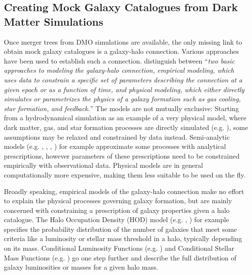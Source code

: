 \subsection{Creating Mock Galaxy Catalogues from Dark Matter Simulations}\label{chap:creating_mock_galaxies}


Once merger trees from DMO simulations are available, the only missing link to obtain mock galaxy catalogues is a galaxy-halo connection.
Various approaches have been used to establish such a connection.
\cite{wechsler_connection} distinguish between ``\textit{two basic approaches to modeling the galaxy-halo connection, \emph{empirical modeling}, which uses data to constrain a specific set of parameters describing the connection at a given epoch or as a function of time, and \emph{physical modeling}, which either directly simulates or parametrizes the physics of a galaxy formation such as gas cooling, star formation, and feedback.}''
The models are not mutually exclusive:
Starting from a hydrodynamical simulation as an example of a very physical model, where dark matter, gas, and star formation processes are directly simulated (e.g. \cite{EAGLE}), some assumptions may be relaxed and constrained by data instead.
Semi-analytic models (e.g. \cite{SA-white}, \cite{SA-durham}, \cite{SA-Somerville}, \cite{SA-Kaufmann}) for example approximate some processes with analytical prescriptions, however parameters of these prescriptions need to be constrained empirically with observational data.
Physical models are in general computationally more expensive, making them less suitable to be used on the fly.

Broadly speaking, empirical models of the galaxy-halo connection make no effort to explain the physical processes governing galaxy formation, but are mainly concerned with constraining a prescription of galaxy properties given a halo catalogue.
The Halo Occupation Density (HOD) model (e.g. \cite{HOD-Seljak}, \cite{HOD-Berlind}) for example specifies the probability distribution of the number of galaxies that meet some criteria like a luminosity or stellar mass threshold in a halo, typically depending on its mass. 
Conditional Luminosity Functions (e.g. \cite{CLF}) and Conditional Stellar Mass Functions (e.g. \cite{CSMF}) go one step further and describe the full distribution of galaxy luminosities or masses for a given halo mass. 

